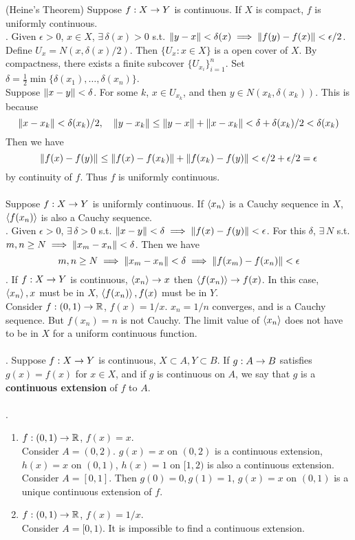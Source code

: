  (Heine's Theorem) Suppose $f:X\rightarrow Y$ is continuous. If $X$ is compact, $f$ is uniformly continuous.\\
\pf. Given $\epsilon > 0$, $x\in X$, $\exists\, \delta(x)>0$ s.t. $\left\lVert y-x\right\rVert < \delta(x) \implies \left\lVert f(y) - f(x)\right\rVert < \epsilon / 2$. \\
Define $U_x = N(x, \delta(x) / 2)$. Then $\{U_x:x\in X\}$ is a open cover of $X$. By compactness, there exists a finite subcover $\{U_{x_i} \}_{i=1}^n$. Set $\delta =\frac{1}{2}\min \{\delta(x_1), \dots, \delta(x_n) \}$.\\
Suppose $\left\lVert x - y\right\rVert< \delta$. For some $k$, $x\in U_{x_k}$, and then $y\in N(x_k, \delta(x_k))$. This is because $$\left\lVert x - x_k\right\rVert < \delta(x_k) / 2, \quad \left\lVert y - x_k\right\rVert \leq \left\lVert y - x\right\rVert + \left\lVert x - x_k\right\rVert < \delta + \delta(x_k) / 2 < \delta(x_k)$$ Then we have $$\left\lVert f(x) - f(y)\right\rVert \leq \left\lVert f(x) - f(x_k)\right\rVert + \left\lVert f(x_k) - f(y)\right\rVert < \epsilon / 2 + \epsilon/ 2 = \epsilon$$ by continuity of $f$. Thus $f$ is uniformly continuous.\\
\\
 Suppose $f:X\rightarrow Y$ is uniformly continuous. If $\left\langle x_n \right\rangle$ is a Cauchy sequence in $X$, $\left\langle f(x_n) \right\rangle$ is also a Cauchy sequence.\\
\pf. Given $\epsilon > 0$, $\exists\,\delta >0$ s.t. $\left\lVert x - y\right\rVert < \delta \implies \left\lVert f(x) - f(y)\right\rVert < \epsilon$. For this $\delta$, $\exists\,N$ s.t. $m, n\geq N\implies \left\lVert x_m-x_n\right\rVert < \delta$. Then we have $$m, n\geq N \implies \left\lVert x_m-x_n\right\rVert < \delta \implies \left\lVert f(x_m) - f(x_n)\right\rVert < \epsilon$$
\rmk. If $f:X\rightarrow Y$ is continuous, $\left\langle x_n \right\rangle \rightarrow x$ then $\left\langle f(x_n) \right\rangle \rightarrow f(x)$. In this case, $\left\langle x_n \right\rangle, x$ must be in $X$, $\left\langle f(x_n) \right\rangle, f(x)$ must be in $Y$.\\
Consider $f:(0, 1)\rightarrow \mathbb{R}$, $f(x) = 1/x$. $x_n = 1/n$ converges, and is a Cauchy sequence. But $f(x_n) = n$ is not Cauchy. The limit value of $\left\langle x_n \right\rangle$ does not have to be in $X$ for a uniform continuous function.\\
\\
. Suppose $f:X\rightarrow Y$ is continuous, $X\subset A, Y\subset B$. If $g:A\rightarrow B$ satisfies $g(x) = f(x)$ for $x\in X$, and if $g$ is continuous on $A$, we say that $g$ is a \textbf{continuous extension} of $f$ to $ A $.\\
\\
\ex.
\begin{enumerate}
	\item $f:(0, 1)\rightarrow \mathbb{R}$, $f(x) = x$.\\
	Consider $A = (0, 2)$. $g(x) = x$ on $(0, 2)$ is a continuous extension, $h(x) = x$ on $(0, 1)$, $h(x) = 1$ on $[1,2)$ is also a continuous extension.\\
	Consider $A = [0 ,1]$. Then $g(0) = 0, g(1)=1$, $g(x) = x$ on $(0, 1)$ is a unique continuous extension of $f$.
	\item $f:(0, 1)\rightarrow\mathbb{R}$, $f(x) = 1/x $.\\
	Consider $A = [0, 1)$. It is impossible to find a continuous extension.
\end{enumerate}~\\
